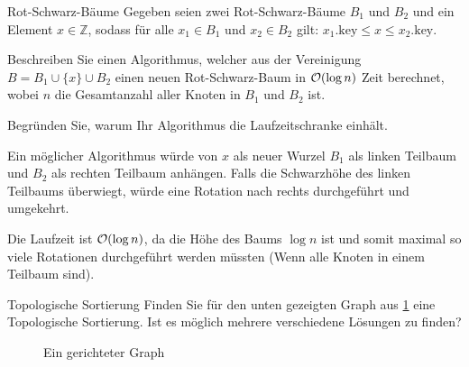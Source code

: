 \documentclass{exercisesheet}
\begin{document}
\begin{eexercises}{Rot-Schwarz-Bäume}{
    Gegeben seien zwei Rot-Schwarz-Bäume $B_1$ und $B_2$ und ein Element $x \in \mathbb{Z}$, sodass für alle $x_1 \in B_1$ und $x_2 \in B_2$ gilt: $x_1.\text{key} \leq x \leq x_2.\text{key}$.
  }
  \item Beschreiben Sie einen Algorithmus, welcher aus der Vereinigung $B = B_1 \cup \{x\} \cup B_2$ einen neuen Rot-Schwarz-Baum in $\mathcal{O}(\log n)$ Zeit berechnet, wobei $n$ die Gesamtanzahl aller Knoten in $B_1$ und $B_2$ ist.
  \item Begründen Sie, warum Ihr Algorithmus die Laufzeitschranke einhält.
\end{eexercises}

\begin{solutions}
  \item Ein möglicher Algorithmus würde von $x$ als neuer Wurzel $B_1$ als linken Teilbaum und $B_2$ als rechten Teilbaum anhängen. Falls die Schwarzhöhe des linken Teilbaums überwiegt, würde eine Rotation nach rechts durchgeführt und umgekehrt.
  \item Die Laufzeit ist $\mathcal{O}(\log n)$, da die Höhe des Baums $\log n$ ist und somit maximal so viele Rotationen durchgeführt werden müssten (Wenn alle Knoten in einem Teilbaum sind).
\end{solutions}



\begin{exercise}{Topologische Sortierung}
  Finden Sie für den unten gezeigten Graph aus \ref{fig:topo} eine Topologische Sortierung. Ist es möglich mehrere verschiedene Lösungen zu finden?
  \begin{figure}[ht]
    \centering

    \caption{Ein gerichteter Graph}\label{fig:topo}
  \end{figure}
\end{exercise}
\end{document}
